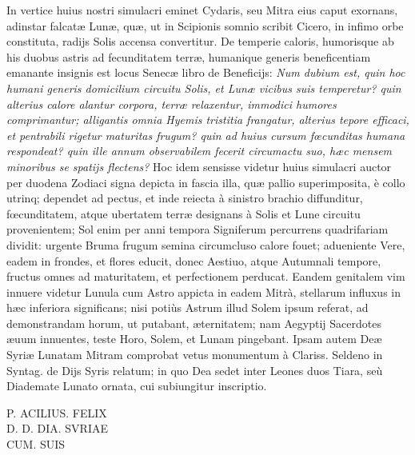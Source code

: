 \documentclass[a4paper, 11pt, oneside, polutonikogreek, latin]{article}
\begin{document}
In vertice huius nostri simulacri eminet Cydaris, seu Mitra eius caput exornans, adinstar falcatæ Lunæ, quæ, ut in Scipionis somnio scribit Cicero, in infimo orbe constituta, radijs Solis accensa convertitur. De temperie caloris, humorisque ab his duobus astris ad fecunditatem terræ, humanique generis beneficentiam emanante insignis est locus Senecæ libro de Beneficijs: \emph{Num dubium est, quin hoc humani generis domicilium circuitu Solis, et Lunæ vicibus suis temperetur? quin alterius calore alantur corpora, terræ relaxentur, immodici humores comprimantur; alligantis omnia Hyemis tristitia frangatur, alterius tepore efficaci, et pentrabili rigetur maturitas frugum? quin ad huius cursum fœcunditas humana respondeat? quin ille annum observabilem fecerit circumactu suo, hæc mensem minoribus se spatijs flectens?} Hoc idem sensisse videtur huius simulacri auctor per duodena Zodiaci signa depicta in fascia illa, quæ pallio superimposita, è collo utrinq; dependet ad pectus, et inde reiecta à sinistro brachio diffunditur, fœcunditatem, atque ubertatem terræ designans à Solis et Lune circuitu provenientem; Sol enim per anni tempora Signiferum percurrens quadrifariam dividit: urgente Bruma frugum semina circumcluso calore fouet; adueniente Vere, eadem in frondes, et flores educit, donec Aestiuo, atque Autumnali tempore, fructus omnes ad maturitatem, et perfectionem perducat. Eandem genitalem vim innuere videtur Lunula cum Astro appicta in eadem Mitrà, stellarum influxus in hæc inferiora significans; nisi potiùs Astrum illud Solem ipsum referat, ad demonstrandam horum, ut putabant, æternitatem; nam Aegyptij Sacerdotes æuum innuentes, teste Horo, Solem, et Lunam pingebant. Ipsam autem Deæ Syriæ Lunatam Mitram comprobat vetus monumentum à Clariss. Seldeno in Syntag. de Dijs Syris relatum; in quo Dea sedet inter Leones duos Tiara, seù Diademate Lunato ornata, cui subiungitur inscriptio.
\begin{center}
P. ACILIUS. FELIX\\
D. D. DIA. SVRIAE\\
CUM. SUIS\\
\end{center}
\end{document}

